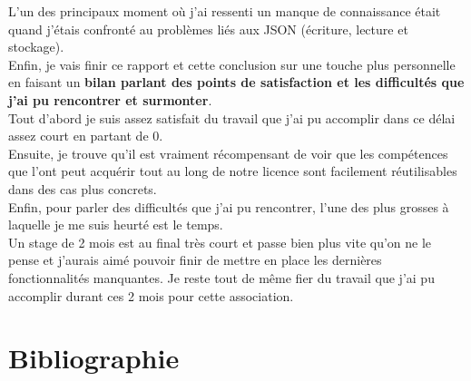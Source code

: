 \documentclass[11pt, twoside]{article}
\begin{document}
L'un des principaux moment où j'ai ressenti un manque de connaissance était quand j'étais confronté au problèmes liés aux JSON (écriture, lecture et stockage).
\vspace*{0.3cm}\\
Enfin, je vais finir ce rapport et cette conclusion sur une touche plus personnelle en faisant un \textbf{bilan parlant des points de satisfaction et les difficultés que j'ai pu rencontrer et surmonter}.
\vspace*{0.2cm}\\
Tout d'abord je suis assez satisfait du travail que j'ai pu accomplir dans ce délai assez court en partant de 0.
\vspace*{0.2cm}\\
Ensuite, je trouve qu'il est vraiment récompensant de voir que les compétences que l'ont peut acquérir tout au long de notre licence sont facilement réutilisables dans des cas plus concrets.
\vspace*{0.2cm}\\
Enfin, pour parler des difficultés que j'ai pu rencontrer, l'une des plus grosses à laquelle je me suis heurté est le temps. \\
Un stage de 2 mois est au final très court et passe bien plus vite qu'on ne le pense et j'aurais aimé pouvoir finir de mettre en place les dernières fonctionnalités manquantes. 
Je reste tout de même fier du travail que j'ai pu accomplir durant ces 2 mois pour cette association.
\newpage

\section{Bibliographie}
\printbibliography
\end{document}
